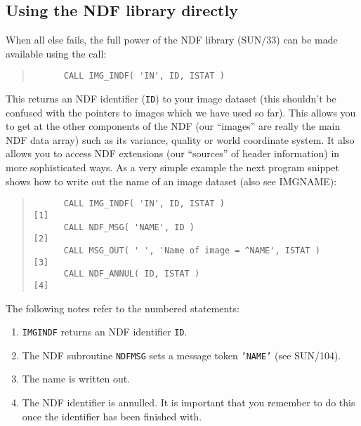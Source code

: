 \documentclass[twoside,11pt]{article}
\newcommand{\htmlref}[2]{#1}
\newcommand{\xref}[3]{#1}
\renewcommand{\_}{\texttt{\symbol{95}}}
\newcommand{\myverb}[1]{{\texttt{#1}}}
\newcommand{\mynote}{The following notes refer to the numbered statements:}
\newenvironment{code}{\begin{small} \begin{quote}}
                     {\end{quote} \end{small}}
\newenvironment{enumnotes}
{
   \renewcommand{\labelenumi}{\myverb{[\theenumi]}}
   \begin{enumerate}
}{
   \end{enumerate}
   \renewcommand{\labelenumi}{\theenumi}
}
\renewenvironment{enumnotes}
  {
    \begin{enumerate}
  }{
    \end{enumerate}
  }
\begin{document}
\subsection{Using the NDF library directly}
When all else fails, the full power of the NDF library
(\xref{SUN/33}{sun33}{}) can be made available using the call:
\begin{code}
\begin{verbatim}
      CALL IMG_INDF( 'IN', ID, ISTAT )
\end{verbatim}
\end{code}
This returns an NDF identifier (\myverb{ID}) to your image dataset
(this shouldn't be confused with the pointers to images which we have
used so far). This allows you to get at the other components of the
NDF (our ``images'' are really the main NDF data array) such as its
variance, quality or world coordinate system. It also allows you to
access NDF extensions (our ``sources'' of header information) in more
sophisticated ways.  As a very simple example the next program snippet
shows how to write out the name of an image dataset 
(also see \htmlref{IMG\_NAME}{IMG\_NAME}):
\begin{code}
\begin{verbatim}
      CALL IMG_INDF( 'IN', ID, ISTAT )                        [1]
      CALL NDF_MSG( 'NAME', ID )                              [2]
      CALL MSG_OUT( ' ', 'Name of image = ^NAME', ISTAT )     [3]
      CALL NDF_ANNUL( ID, ISTAT )                             [4]
\end{verbatim}
\end{code}
\mynote
\begin{enumnotes}
\item
\htmlref{\myverb{IMG\_INDF}}{IMG_INDF} returns an NDF identifier \myverb{ID}.

\item
The NDF subroutine \myverb{NDF\_MSG} sets a message token \myverb{'NAME'}
(see \xref{SUN/104}{sun104}{}).

\item
The name is written out.

\item
The NDF identifier is annulled. It is important that you remember to
do this once the identifier has been finished with.
\end{enumnotes}
\end{document}

